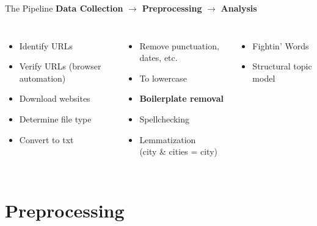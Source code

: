 \documentclass[12pt]{beamer}
\begin{document}
\begin{frame}{The Pipeline}
	\textbf{Data Collection} \hspace{2mm} $\rightarrow$ \hspace{2mm} \textbf{Preprocessing} \hspace{2mm} $\rightarrow$ \hspace{2mm} \textbf{Analysis}
	\begin{columns}
		\vspace{5mm}
		\begin{itemize}
			\item Identify URLs
			\item Verify URLs (browser automation)
			\item Download websites
			\item Determine file type
			\item Convert to txt
		\end{itemize}		
		\vspace{5mm}
		\begin{itemize}
			\item Remove punctuation, dates, etc.
			\item To lowercase
			\item \textbf{Boilerplate removal}
			\item Spellchecking
			\item Lemmatization \\ (city \& cities = city)
		\end{itemize}
		\vspace{5mm}
		\begin{itemize}
			\item Fightin' Words
			\item Structural topic model
		\end{itemize}
	\end{columns}
\end{frame}

\section{Preprocessing}
\end{document}
